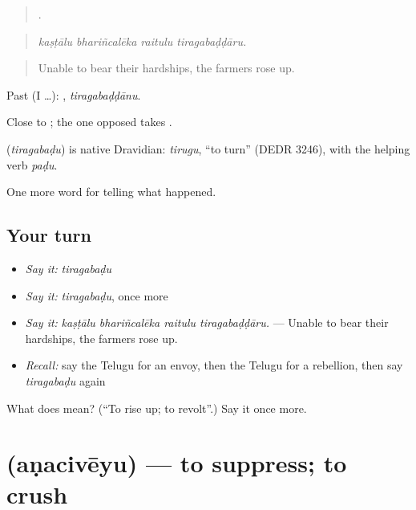 \begin{quote}
   .
\end{quote}

\begin{quote}
\emph{kaṣṭālu bhariñcalēka raitulu tiragabaḍḍāru.}
\end{quote}

\begin{quote}
Unable to bear their hardships, the farmers rose up.
\end{quote}

Past (I …): , \emph{tiragabaḍḍānu}.

Close to  ; the one opposed takes .

\begin{cousinweb}
\textbf{} (\emph{tiragabaḍu}) is native Dravidian: \emph{tirugu}, \textquotedblleft{}to turn\textquotedblright{} (DEDR 3246), with the helping verb \emph{paḍu}.
\end{cousinweb}

\begin{grammarlens}[title={What you've built}]
One more word for telling what happened.
\end{grammarlens}

\subsection*{Your turn}
\begin{itemize}
\raggedright
  \item \emph{Say it:} \emph{tiragabaḍu}
  \item \emph{Say it:} \emph{tiragabaḍu}, once more
  \item \emph{Say it:} \emph{kaṣṭālu bhariñcalēka raitulu tiragabaḍḍāru.} — Unable to bear their hardships, the farmers rose up.
  \item \emph{Recall:} say the Telugu for an envoy, then the Telugu for a rebellion, then say \emph{tiragabaḍu} again
\end{itemize}

\begin{tcolorbox}[breakable,colback=teal!4,colframe=teal!35!black,title={Before you move on}]
What does  mean? (\textquotedblleft{}To rise up; to revolt\textquotedblright{}.) Say it once more.
\end{tcolorbox}
\section[\texorpdfstring{\te{అణచివేయు} (aṇacivēyu)}{అణచివేయు (aṇacivēyu)}]{ (aṇacivēyu) — to suppress; to crush}

